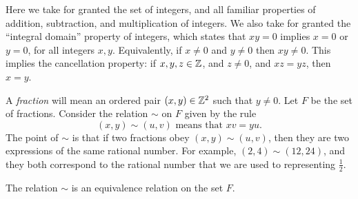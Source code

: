 Here we take for granted the set of integers, and all familiar properties of addition, subtraction, and multiplication of integers.
We also take for granted the ``integral domain'' property of integers, which states that $xy = 0$ implies $x = 0$ or $y = 0$, for all integers $x,y$.
Equivalently, if $x \neq 0$ and $y \neq 0$ then $xy \neq 0$.
This implies the cancellation property: if $x,y,z \in \mathbb Z$, and $z \neq 0$, and $xz = yz$, then $x = y$.

A \emph{fraction} will mean an ordered pair $(x,y) \in \mathbb Z^2$ such that $y \neq 0$. Let $F$ be the set of fractions. Consider the relation $\sim$ on $F$ given by the rule
$$
	(x,y) \sim (u,v) \text{ means that } xv = yu.
$$
The point of $\sim$ is that if two fractions obey $(x,y)\sim(u,v)$, then they are two expressions of the same rational number.
For example, $(2,4)\sim(12,24)$, and they both correspond to the rational number that we are used to representing $\frac{1}{2}$.

\begin{thm} \label{thm:EquivaentFractions}
	The relation $\sim$ is an equivalence relation on the set $F$.
\end{thm}

